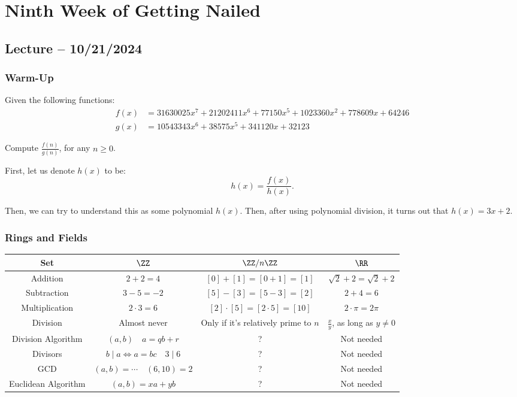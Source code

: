 \documentclass[openany]{book}
\begin{document}
\chapter{Ninth Week of Getting Nailed}
\section{Lecture -- 10/21/2024}
\subsection{Warm-Up}
\begin{hw}
	Given the following functions:
	\begin{align*}
		f(x) &= 31630025x^{7} + 21202411x^{6} + 77150x^{5} + 1023360x^{2} + 778609x + 64246 \\
		g(x) &= 10543343x^{6} + 38575x^{5} + 341120x + 32123
	\end{align*}
	
	Compute $\frac{f(n)}{g(n)}$, for any $n \geq 0$.
\end{hw}
\begin{solution}
	First, let us denote $h(x)$ to be:
	\begin{equation*}
		h(x) = \frac{f(x)}{h(x)}.
	\end{equation*}

	Then, we can try to understand this as some polynomial $h(x)$. Then, after using polynomial division, it turns out that $h(x) = 3x+2$.
\end{solution}

\subsection{Rings and Fields}
\begin{center}
	\begin{tabular}{c|c|c|c}
		Set & $\ZZ$ & $\ZZ/n\ZZ$ & $\RR$ \\
		\hline
		Addition & $2 + 2 = 4$ & $[0] + [1] = [0 + 1] = [1]$ & $\sqrt{2} + 2 = \sqrt{2} + 2$ \\
		Subtraction & $3 - 5 = -2$ & $[5] - [3] = [5-3] = [2]$ & $2 + 4 = 6$ \\
		\hline
		Multiplication & $2 \cdot 3 = 6$ & $[2]\cdot[5] = [2 \cdot 5] = [10]$ & $2 \cdot \pi = 2\pi$ \\
		Division & Almost never & Only if it's relatively prime to $n$ & $\frac{x}{y}$, as long as $y \neq 0$ \\
		\hline
		Division Algorithm & $(a,b) \quad a = qb + r$ & ? & Not needed \\
		\hline
		Divisors & $b \mid a \iff a = bc \quad 3 \mid 6$ & ? & Not needed \\
		\hline
		GCD & $(a,b) = \cdots \quad (6,10) = 2$ & ? & Not needed \\
		\hline
		Euclidean Algorithm & $(a,b) = xa + yb$ & ? & Not needed
 	\end{tabular}
\end{center}
\end{document}
